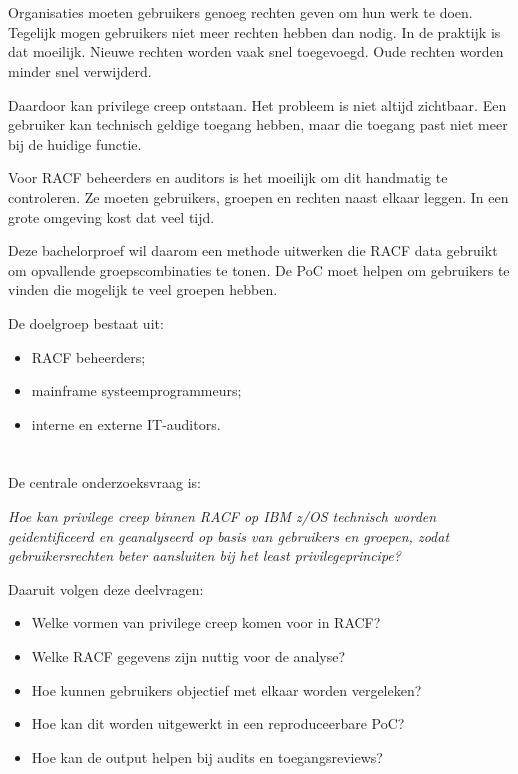 \section{}%
\label{sec:probleemstelling}

Organisaties moeten gebruikers genoeg rechten geven om hun werk te doen. Tegelijk mogen gebruikers niet meer rechten hebben dan nodig. In de praktijk is dat moeilijk. Nieuwe rechten worden vaak snel toegevoegd. Oude rechten worden minder snel verwijderd.

Daardoor kan privilege creep ontstaan. Het probleem is niet altijd zichtbaar. Een gebruiker kan technisch geldige toegang hebben, maar die toegang past niet meer bij de huidige functie.

Voor RACF beheerders en auditors is het moeilijk om dit handmatig te controleren. Ze moeten gebruikers, groepen en rechten naast elkaar leggen. In een grote omgeving kost dat veel tijd.

Deze bachelorproef wil daarom een methode uitwerken die RACF data gebruikt om opvallende groepscombinaties te tonen. De PoC moet helpen om gebruikers te vinden die mogelijk te veel groepen hebben.

De doelgroep bestaat uit:

\begin{itemize}
	\item RACF beheerders;
	\item mainframe systeemprogrammeurs;
	\item interne en externe IT-auditors.
\end{itemize}

\section{}%
\label{sec:onderzoeksvraag}

De centrale onderzoeksvraag is:

\textit{Hoe kan privilege creep binnen RACF op IBM z/OS technisch worden geidentificeerd en geanalyseerd op basis van gebruikers en groepen, zodat gebruikersrechten beter aansluiten bij het least privilegeprincipe?}

Daaruit volgen deze deelvragen:

\begin{itemize}
	\item Welke vormen van privilege creep komen voor in RACF?
	\item Welke RACF gegevens zijn nuttig voor de analyse?
	\item Hoe kunnen gebruikers objectief met elkaar worden vergeleken?
	\item Hoe kan dit worden uitgewerkt in een reproduceerbare PoC?
	\item Hoe kan de output helpen bij audits en toegangsreviews?
\end{itemize}

